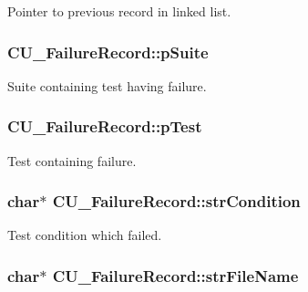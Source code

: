 Pointer to previous record in linked list. 

\hypertarget{struct_c_u___failure_record_a773e1afb22505c6fc487043222617731}{
\subsubsection[{p\+Suite}]{ C\+U\+\_\+\+Failure\+Record\+::p\+Suite}}\label{struct_c_u___failure_record_a773e1afb22505c6fc487043222617731}


Suite containing test having failure. 

\hypertarget{struct_c_u___failure_record_ad1c88882d83b15d2c2d73a8562f8fced}{
\subsubsection[{p\+Test}]{ C\+U\+\_\+\+Failure\+Record\+::p\+Test}}\label{struct_c_u___failure_record_ad1c88882d83b15d2c2d73a8562f8fced}


Test containing failure. 

\hypertarget{struct_c_u___failure_record_a645edad1e32b1533bd55c501b2c4d591}{
\subsubsection[{str\+Condition}]{\setlength{\rightskip}{0pt plus 5cm}char$\ast$ C\+U\+\_\+\+Failure\+Record\+::str\+Condition}}\label{struct_c_u___failure_record_a645edad1e32b1533bd55c501b2c4d591}


Test condition which failed. 

\hypertarget{struct_c_u___failure_record_a5b72f6fe23e35605545809f435884da3}{
\subsubsection[{str\+File\+Name}]{\setlength{\rightskip}{0pt plus 5cm}char$\ast$ C\+U\+\_\+\+Failure\+Record\+::str\+File\+Name}}\label{struct_c_u___failure_record_a5b72f6fe23e35605545809f435884da3}



